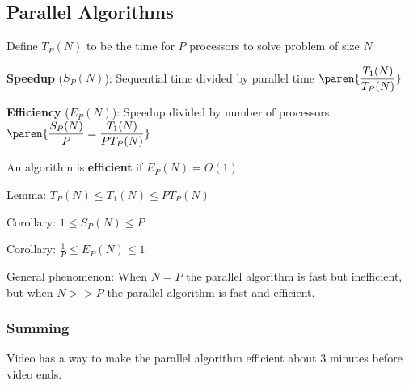 \subsection{Parallel Algorithms}

Define $T_P(N)$ to be the time for $P$ processors to solve problem of size $N$

\textbf{Speedup} ($S_P(N)$): Sequential time divided by parallel time $\displaystyle \paren{\frac{T_1(N)}{T_P(N)}}$

\textbf{Efficiency} ($E_P(N)$): Speedup divided by number of processors $\displaystyle \paren{\frac{S_P(N)}{P} = \frac{T_1(N)}{PT_P(N)}}$

An algorithm is \textbf{efficient} if $E_P(N) = \Theta(1)$

Lemma: $T_P(N) \leq T_1(N) \leq PT_P(N)$

Corollary: $1 \leq S_P(N) \leq P$

Corollary: $\displaystyle \frac 1 P \leq E_P(N) \leq 1$

General phenomenon: When $N = P$ the parallel algorithm is fast but inefficient, but when $N >> P$ the parallel algorithm is fast and efficient.

\subsubsection*{Summing}

Video has a way to make the parallel algorithm efficient about 3 minutes before video ends.
